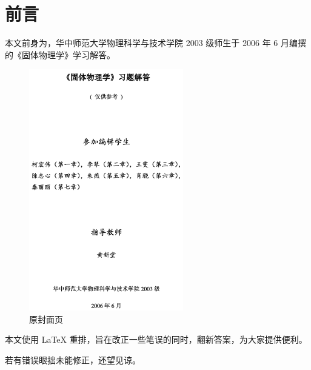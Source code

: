 \chapter{前言\label{ch:preface}}

本文前身为，华中师范大学物理科学与技术学院 2003 级师生于 2006 年 6 月编撰的《固体物理学》学习解答。

\begin{figure}[htbp]
    \centering
    \includegraphics[width=0.6\textwidth]{pic/原封面页.png}
    \caption{原封面页}
\end{figure}

本文使用 \LaTeX{} 重排，旨在改正一些笔误的同时，翻新答案，为大家提供便利。

若有错误眼拙未能修正，还望见谅。
